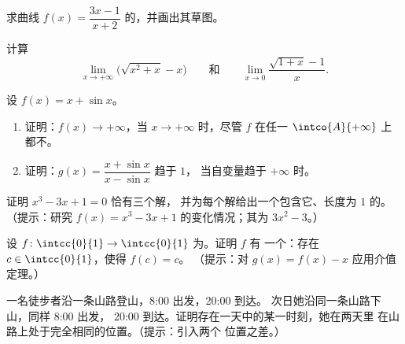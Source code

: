 \begin{exercise}[$\star$]\label{exo:g12:limcont:3}
求曲线
$f(x) = \dfrac{3x - 1}{x + 2}$ 的，并画出其草图。
\end{exercise}

\begin{exercise}[$\star\star$]\label{exo:g12:limcont:4}
计算
\[
\lim_{x\to+\infty} \bigl(\sqrt{x^2 + x} - x\bigr)
\qquad\text{和}\qquad
\lim_{x\to 0} \frac{\sqrt{1+x} - 1}{x}.
\]
\end{exercise}

\begin{exercise}[$\star\star$]\label{exo:g12:limcont:5}
设 $f(x) = x + \sin x$。
\begin{enumerate}
  \item 证明：$f(x) \to +\infty$，当 $x \to +\infty$ 时，尽管 $f$ 在任一
         $\intco{A}{+\infty}$ 上都不。
  \item 证明：$g(x) = \dfrac{x + \sin x}{x - \sin x}$ 趋于 $1$，
        当自变量趋于 $+\infty$ 时。
\end{enumerate}
\end{exercise}

\begin{exercise}[$\star\star$]\label{exo:g12:limcont:6}
  证明 $x^3 - 3x + 1 = 0$ 恰有三个解，
  并为每个解给出一个包含它、长度为 $1$ 的。
  （提示：研究 $f(x) = x^3 - 3x + 1$ 的变化情况；其为
  $3x^2 - 3$。）
\end{exercise}

\begin{exercise}[$\star\star$]\label{exo:g12:limcont:7}
  设 $f \colon \intcc{0}{1} \to \intcc{0}{1}$ 为。证明 $f$ 有
  一个\emph{}：存在 $c \in \intcc{0}{1}$，使得 $f(c) = c$。
  （提示：对 $g(x) = f(x) - x$ 应用介值定理。）
\end{exercise}

\begin{exercise}[$\star\star\star$]\label{exo:g12:limcont:8}
  一名徒步者沿一条山路登山，8:00 出发，20:00 到达。
  次日她沿同一条山路下山，同样 8:00 出发，
  20:00 到达。证明存在一天中的某一时刻，她在两天里
  在山路上处于完全相同的位置。（提示：引入两个
  位置之差。）
\end{exercise}

